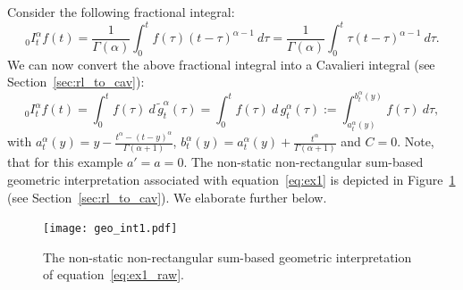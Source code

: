 \documentclass[twoside,reqno,11pt]{fcaa-var} %
\begin{document}
\noindent
Consider the following fractional integral:
\begin{equation}
\label{eq:ex1_raw}
_0I_t^{\alpha} f(t) = \frac{1}{\Gamma(\alpha)}\int_0^t f(\tau) (t-\tau)^{\alpha-1}~d\tau = \frac{1}{\Gamma(\alpha)}\int_0^t \tau(t-\tau)^{\alpha-1}~d\tau. 
\end{equation}
We can now convert the above fractional integral into a Cavalieri integral (see Section~\ref{sec:rl_to_cav}):
\begin{equation}
\label{eq:ex1}
_0I_t^{\alpha} f(t) = \int_0^t f(\tau)~d\,\widetilde{g}_t^{\alpha}(\tau)=\int_0^t f(\tau)~d\,g_t^{\alpha}(\tau):=\int_{a_t^{\alpha}(y)}^{b_t^{\alpha}(y)} f(\tau)~d\tau,
\end{equation}
with $a_t^{\alpha}(y) = y - \frac{t^{\alpha}-(t-y)^{\alpha}}{\Gamma(\alpha+1)}$, $b_t^{\alpha}(y) = a_t^{\alpha}(y) + \frac{t^{\alpha}}{\Gamma(\alpha+1)}$ and $C=0$.
Note, that for this example $a'=a=0$. The non-static non-rectangular sum-based geometric interpretation associated with equation~\eqref{eq:ex1} is depicted in Figure~\ref{fig:geo1} (see Section~\ref{sec:rl_to_cav}). We elaborate further below.\\  

\begin{figure}[htb]
\centering
\texttt{[image: geo\_int1.pdf]}
\caption{The non-static non-rectangular sum-based geometric interpretation of equation~\eqref{eq:ex1_raw}.}
\label{fig:geo1}
\end{figure}

\end{document}
